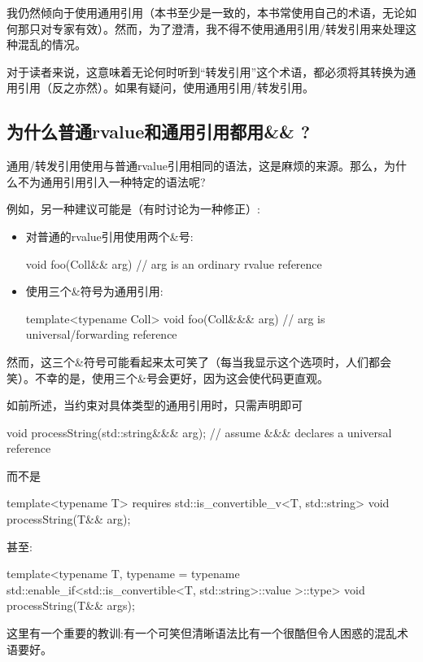 我仍然倾向于使用通用引用（本书至少是一致的，本书常使用自己的术语，无论如何那只对专家有效）。然而，为了澄清，我不得不使用通用引用/转发引用来处理这种混乱的情况。

对于读者来说，这意味着无论何时听到“转发引用”这个术语，都必须将其转换为通用引用（反之亦然）。如果有疑问，使用通用引用/转发引用。

\subsection{为什么普通rvalue和通用引用都用\&\& ?}

通用/转发引用使用与普通rvalue引用相同的语法，这是麻烦的来源。那么，为什么不为通用引用引入一种特定的语法呢?

例如，另一种建议可能是（有时讨论为一种修正）:

\begin{itemize}
\item 对普通的rvalue引用使用两个\&号:
\begin{cppcode}
void foo(Coll&& arg) // arg is an ordinary rvalue reference
\end{cppcode}
\item 使用三个\&符号为通用引用:
\begin{cppcode}
template<typename Coll>
void foo(Coll&&& arg) // arg is universal/forwarding reference
\end{cppcode}
\end{itemize}

然而，这三个\&符号可能看起来太可笑了（每当我显示这个选项时，人们都会笑）。不幸的是，使用三个\&号会更好，因为这会使代码更直观。

如前所述，当约束对具体类型的通用引用时，只需声明即可

\begin{cppcode}
void processString(std::string&&& arg); // assume &&& declares a universal reference
\end{cppcode}

而不是

\begin{cppcode}
template<typename T>
requires std::is_convertible_v<T, std::string>
void processString(T&& arg);
\end{cppcode}

甚至:

\begin{cppcode}
template<typename T,
	typename =
		typename std::enable_if<std::is_convertible<T, std::string>::value
			>::type>
void processString(T&& args);
\end{cppcode}

这里有一个重要的教训:有一个可笑但清晰语法比有一个很酷但令人困惑的混乱术语要好。

















